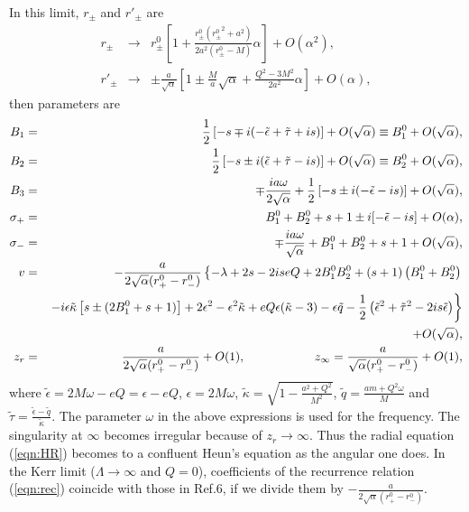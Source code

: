 In this limit, $r_\pm$ and $r'_\pm$ are
%
\begin{eqnarray}
r_\pm &\longrightarrow& r^0_\pm \left[ 1+\frac{r^0_\pm ({r^0_\pm}^2+a^2)}
{2a^2(r^0_\pm-M)} \alpha \right]
+ O(\alpha^2), \\
r'_\pm &\longrightarrow& \pm \frac{a}{\sqrt{\alpha}} \left[
1\pm \frac{M}{a} \sqrt{\alpha} +\frac{Q^2-3M^2}{2a^2} \alpha \right] 
+O(\alpha),
\end{eqnarray}
%
then parameters are
%
\begin{eqnarray}
B_1 &=& 
\frac{1}{2}\left[
- s\mp i(-\tilde{\epsilon}+\tilde{\tau}+is)\right]+O(\sqrt{\alpha})
\equiv B^0_1+O(\sqrt{\alpha}), \nonumber \\
B_2 &=& \frac{1}{2}\left[
- s\pm i(\tilde{\epsilon}+\tilde{\tau}-is)\right]+O(\sqrt{\alpha})
\equiv B^0_2+O(\sqrt{\alpha}), \nonumber \\
B_3 &=&
\mp  \displaystyle{\frac{ia\omega}{2\sqrt{\alpha}}
+\frac{1}{2}\left[-s\pm
i(-\tilde{\epsilon}-is)\right]+O(\sqrt{\alpha})}, \nonumber \\
\sigma_+ &=&
B^0_1+B^0_2+s +1\pm i[-\tilde{\epsilon}-is]+O(\alpha), \nonumber \\
\sigma_- &=&
\mp \frac{ia\omega}{\sqrt{\alpha}}
+B^0_1+B^0_2+s+1+O(\sqrt{\alpha}),  \\
v &=& -\frac{a}{2\sqrt{\alpha}(r^0_+ -r^0_-)} \left\{
-\lambda+2s-2iseQ+2B^0_1B^0_2+(s+1)\left(B^0_1+B^0_2\right) 
\right.\nonumber \\ & & \left. -i\epsilon \tilde{\kappa}
\left[s\pm (2B^0_1+s+1)\right]
+2\epsilon^2-\epsilon^2\tilde{\kappa}+eQ\epsilon(\tilde{\kappa}-3)
-\epsilon\tilde{q}
-\frac{1}{2}\left( \tilde{\epsilon}^2+\tilde{\tau}^2
- 2is\tilde{\epsilon} \right)
\right\} \nonumber \\
& & +O(\sqrt{\alpha}),  \nonumber \\
z_r &=& \frac{a}{2\sqrt{\alpha}(r^0_+ -r^0_-)}+O(1),\makebox[2cm]{} 
z_\infty= \displaystyle{\frac{a}{\sqrt{\alpha}(r^0_+ -r^0_-)}+O(1)}, 
\end{eqnarray}
%
where $\tilde{\epsilon}=2M\omega-eQ=\epsilon-eQ$, $\epsilon=2M\omega$, 
$\tilde{\kappa}=\sqrt{1-\frac{a^2+Q^2}{M^2}}$, 
$\tilde{q}=\frac{am+Q^2\omega}{M}$ and 
$\tilde{\tau}=\displaystyle{
\frac{\tilde{\epsilon}-\tilde{q}}{\tilde{\kappa}}}$. 
The parameter $\omega$ in the above expressions is used for 
the frequency. 
The singularity at $\infty$ becomes irregular because of 
$z_r \rightarrow \infty$. Thus the radial equation (\ref{eqn:HR}) 
becomes to a confluent Heun's equation as the angular one does. 
In the Kerr limit ($\Lambda \to \infty$ and $Q=0$), coefficients of 
the recurrence relation (\ref{eqn:rec}) coincide with those in Ref.6, 
if we divide them 
by $\displaystyle{-\frac{a}{2\sqrt{\alpha}(r^0_+ -r^0_-)}}$.

